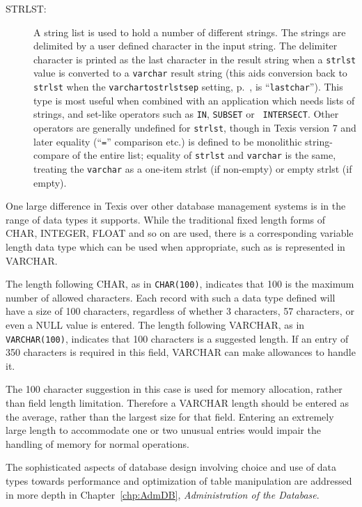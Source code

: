 \begin{description}
\begin{description}
\item[STRLST:] A string list is used to hold a number of different
strings.  The strings are delimited by a user defined character in the
input string.  The delimiter character is printed as the last
character in the result string when a \verb`strlst` value is converted
to a \verb`varchar` result string (this aids conversion back to
\verb`strlst` when the \verb`varchartostrlstsep` setting,
p.~\pageref{`varchartostrlstsep'}, is ``\verb`lastchar`'').  This type
is most useful when combined with an application which needs lists of
strings, and set-like operators such as {\tt IN}, {\tt SUBSET} or {\tt
INTERSECT}.  Other operators are generally undefined for {\tt strlst},
though in Texis version 7 and later equality (``\verb`=`'' comparison
etc.) is defined to be monolithic string-compare of the entire list;
equality of {\tt strlst} and {\tt varchar} is the same, treating the
{\tt varchar} as a one-item strlst (if non-empty) or empty strlst (if
empty).
\end{description}

One large difference in Texis over other database management systems
is in the range of data types it supports.  While the traditional
fixed length forms of CHAR, INTEGER, FLOAT and so on are used, there
is a corresponding variable length data type which can be used when
appropriate, such as is represented in VARCHAR.

The length following CHAR, as in \verb`CHAR(100)`, indicates that 100
is the maximum number of allowed characters.  Each record with such a
data type defined will have a size of 100 characters, regardless of
whether 3 characters, 57 characters, or even a NULL value is entered.
The length following VARCHAR, as in \verb`VARCHAR(100)`, indicates
that 100 characters is a suggested length.  If an entry of 350
characters is required in this field, VARCHAR can make allowances to
handle it.

The 100 character suggestion in this case is used for memory
allocation, rather than field length limitation.  Therefore a VARCHAR
length should be entered as the average, rather than the largest size
for that field.  Entering an extremely large length to accommodate one
or two unusual entries would impair the handling of memory for normal
operations.

The sophisticated aspects of database design involving choice and use
of data types towards performance and optimization of table
manipulation are addressed in more depth in Chapter~\ref{chp:AdmDB},
{\em Administration of the Database}.


\end{description}
